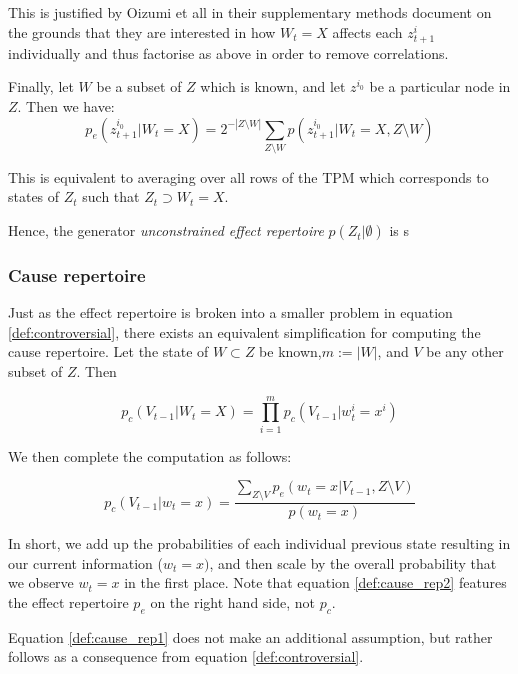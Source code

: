 This is justified by Oizumi et all \cite{oizumi2014phenomenology} in their supplementary methods document on the grounds that they are interested in how $W_t=X$ affects each $z^i_{t+1}$ individually and thus factorise as above in order to remove correlations.


Finally, let $W$ be a subset of $Z$ which is known, and let $z^{i_0}$ be a particular node in $Z$. Then we have:
\begin{equation}
\label{def:effect_repertoire}
p_e(z_{t+1}^{i_0}|W_t = X) = 2^{-|Z\setminus W|}\sum \limits_{Z\setminus W} p(z_{t+1}^{i_0}|W_t = X, Z\setminus W)
\end{equation}

This is equivalent to averaging over all rows of the TPM which corresponds to states of $Z_t$ such that $Z_t \supset W_t = X$.

Hence, the generator \textit{unconstrained effect repertoire} $p(Z_t | \emptyset)$ is s

\subsubsection{Cause repertoire}

Just as the effect repertoire is broken into a smaller problem in equation \ref{def:controversial}, there exists an equivalent simplification for computing the cause repertoire. Let the state of $W \subset Z$ be known,$m:=|W|$, and $V$ be any other subset of $Z$. Then 

\begin{equation}
\label{def:cause_rep1}
p_c(V_{t-1} | W_t=X) = \prod \limits_{i = 1}^{m} p_c(V_{t-1}|w^i_{t} = x^i)
\end{equation}

We then complete the computation as follows:

\begin{equation}
\label{def:cause_rep2}
p_c(V_{t-1}| w_t = x) = \frac{\sum \limits_{Z\setminus V} p_e(w_t = x| V_{t-1}, Z \setminus V)}{p(w_t = x)}
\end{equation}

In short, we add up the probabilities of each individual previous state resulting in our current information ($w_t = x)$, and then scale by the overall probability that we observe $w_t = x$ in the first place. Note that equation \ref{def:cause_rep2} features the effect repertoire $p_e$ on the right hand side, not $p_c$.

\begin{remark}
	Equation \ref{def:cause_rep1} does not make an additional assumption, but rather follows as a consequence from equation \ref{def:controversial}.
\end{remark}



